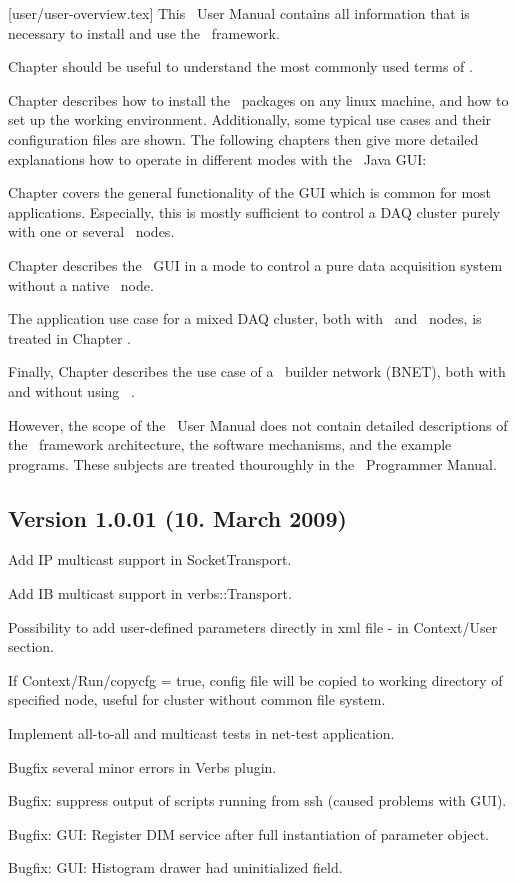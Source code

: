 [user/user-overview.tex]
This \dabc\ User Manual contains all information that is necessary to
install and use the \dabc\ framework.

Chapter  should be useful to understand the
most commonly used terms of \dabc.

Chapter  describes how to install the
\dabc\ packages on any linux machine, and how to set up the working
environment. Additionally, some typical use cases and their configuration
files are shown. 
The following chapters then give more detailed explanations how to operate
in different modes with the \dabc\ Java GUI:

Chapter 
covers the general functionality of the GUI
which is common for most applications. Especially, this 
is mostly sufficient
to control a DAQ cluster purely with one or several \dabc\ nodes.

Chapter  describes the \dabc\ GUI 
in a mode to control a pure \mbs data acquisition system without 
a native \dabc\ node.

The application use case for a mixed DAQ cluster, both with \dabc\ and \mbs\ nodes, is
treated in Chapter .

Finally, Chapter  describes the use case of
a \dabc\ builder network (BNET), both with and without using \mbs\ .

However, the scope of the \dabc\ User Manual does not contain 
detailed descriptions of the \dabc\ framework architecture, 
the software mechanisms, and the example programs. 
These subjects are treated thouroughly
in the \dabc\ Programmer Manual.


\subsection{Version 1.0.01 (10. March 2009)} 
\bnum
\item Add IP multicast support in SocketTransport.
\item Add IB multicast support in verbs::Transport.
\item Possibility to add user-defined parameters directly in xml file - 
      in Context/User section.
\item If Context/Run/copycfg = true, config file will be copied to working
      directory of specified node, useful for cluster without common file system.
\item Implement all-to-all and multicast tests in net-test application.
\item Bugfix several minor errors in Verbs plugin.
\item Bugfix: suppress output of scripts running from ssh (caused problems with GUI).
\item Bugfix: GUI: Register DIM service after full instantiation of parameter object.
\item Bugfix: GUI: Histogram drawer had uninitialized field.
\enum

